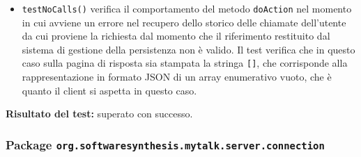 \begin{itemize}
\begin{itemize}
\item \texttt{testNoCalls()} verifica il comportamento del metodo \texttt{doAction} nel momento in cui avviene un errore nel recupero dello storico delle chiamate dell'utente da cui proviene la richiesta dal momento che il riferimento restituito dal sistema di gestione della persistenza non è valido. Il test verifica che in questo caso sulla pagina di risposta sia stampata la stringa \texttt{[]}, che corrisponde alla rappresentazione in formato JSON di un array enumerativo vuoto, che è quanto il client si aspetta in questo caso.

\end{itemize}
\textbf{Risultato del test:} superato con successo.

\end{itemize}


\subsubsection{Package \texttt{org.softwaresynthesis.mytalk.server.connection}}
